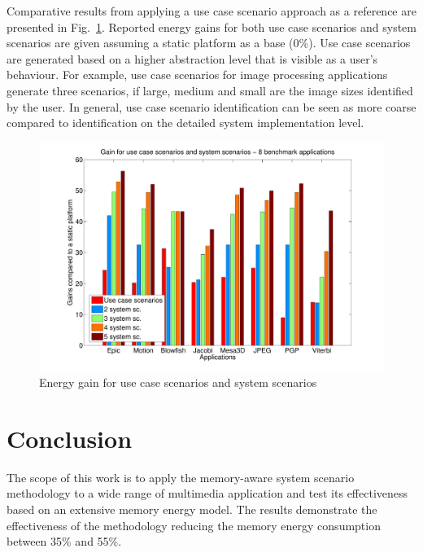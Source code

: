 Comparative results from applying a use case scenario approach as a reference are presented in Fig.~\ref{fig:usecase}. Reported energy gains for both use case scenarios and system scenarios are given assuming a static platform as a base (0\%). Use case scenarios are generated based on a higher abstraction level that is visible as a user's behaviour. For example, use case scenarios for image processing applications generate three scenarios, if large, medium and small are the image sizes identified by the user. In general, use case scenario identification can be seen as more coarse compared to identification on the detailed system implementation level.
 
\begin{figure}[!t]
\centering
\includegraphics[width=\textwidth]{B/Images/usecase.pdf}
\caption{Energy gain for use case scenarios and system scenarios}
\label{fig:usecase}
\end{figure}

\section{Conclusion}

The scope of this work is to apply the memory-aware system scenario methodology to a wide range of multimedia application and test its effectiveness based on an extensive memory energy model. The results demonstrate the effectiveness of the methodology reducing the memory energy consumption between 35\% and 55\%. 


